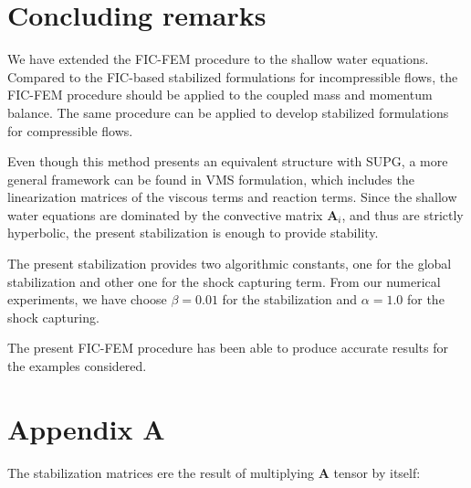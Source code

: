 \documentclass[a4paper,12pt]{article}
\newcommand\Miguel[1]{\ifthenelse{\boolean{show_comments}}{\textcolor{red}{#1}}{}}
\begin{document}
\section{Concluding remarks} \label{sec:conclusions}

We have extended the FIC-FEM procedure to the shallow water equations. Compared to the FIC-based stabilized formulations for incompressible flows, the FIC-FEM procedure should be applied to the coupled mass and momentum balance. The same procedure can be applied to develop stabilized formulations for compressible flows.\Miguel{NO SE SI S'ENTÉN AIXÒ: QUE NO ES POT ESTABILITZAR EL MOMENT PER UNA BANDA I LA MASSA PER L'ALTRA BANDA}

Even though this method presents an equivalent structure with SUPG, a more general framework can be found in VMS formulation, which includes the linearization matrices of the viscous terms and reaction terms. Since the shallow water equations are dominated by the convective matrix $\mathbf{A}_i$, and thus are strictly hyperbolic, the present stabilization is enough to provide stability.

The present stabilization provides two algorithmic constants, one for the global stabilization and other one for the shock capturing term. From our numerical experiments, we have choose $\beta=0.01$ for the stabilization and $\alpha=1.0$ for the shock capturing.

The present FIC-FEM procedure has been able to produce accurate results for the examples considered.


\section*{Appendix A}

The stabilization matrices ere the result of multiplying $\mathbf{A}$ tensor by itself:
\end{document}
